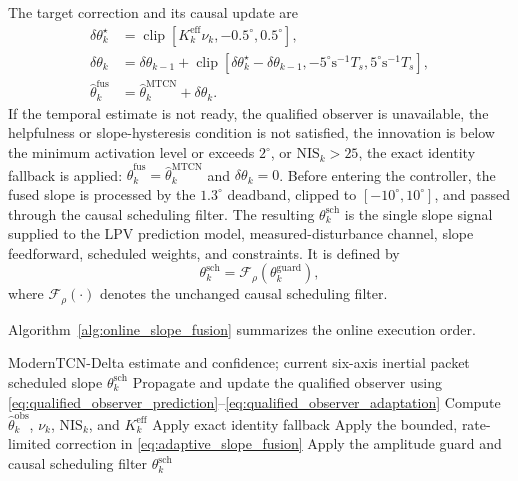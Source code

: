 \documentclass{ieeeaccess}
\begin{document}
The target correction and its causal update are
\begin{align}
\delta\theta_k^{\star}
&=\operatorname{clip}\!\left[
K_k^{\mathrm{eff}}\nu_k,-0.5^{\circ},0.5^{\circ}\right],\nonumber\\
\delta\theta_k
&=\delta\theta_{k-1}
+\operatorname{clip}\!\left[
\delta\theta_k^{\star}-\delta\theta_{k-1},
-5^{\circ}\mathrm{s}^{-1}T_s,5^{\circ}\mathrm{s}^{-1}T_s\right],\nonumber\\
\hat\theta_k^{\mathrm{fus}}
&=\hat\theta_k^{\mathrm{MTCN}}+\delta\theta_k .
\label{eq:adaptive_slope_fusion}
\end{align}
If the temporal estimate is not ready, the qualified observer is unavailable,
the helpfulness or slope-hysteresis condition is not satisfied, the innovation
is below the minimum activation level or exceeds $2^{\circ}$, or
$\mathrm{NIS}_k>25$, the exact identity fallback is applied:
$\hat\theta_k^{\mathrm{fus}}=\hat\theta_k^{\mathrm{MTCN}}$ and
$\delta\theta_k=0$. Before entering the controller, the fused slope is
processed by the $1.3^{\circ}$ deadband, clipped to
$[-10^{\circ},10^{\circ}]$, and passed through the causal scheduling filter.
The resulting $\theta_k^{\mathrm{sch}}$ is the single slope signal supplied to
the LPV prediction model, measured-disturbance channel, slope feedforward,
scheduled weights, and constraints. It is defined by
\begin{equation}
\theta_k^{\mathrm{sch}}=\mathcal F_{\rho}\!\left(\theta_k^{\mathrm{guard}}\right),
\label{eq:fused_slope_conditioning}
\end{equation}
where $\mathcal F_{\rho}(\cdot)$ denotes the unchanged causal scheduling
filter.

Algorithm~\ref{alg:online_slope_fusion} summarizes the online execution order.
\begin{algorithm}[!t]
\caption{Online slope fusion assisted by the qualified observer}
\label{alg:online_slope_fusion}
\begin{algorithmic}[1]
\Require ModernTCN-Delta estimate and confidence; current six-axis inertial packet
\Ensure scheduled slope $\theta_k^{\mathrm{sch}}$
\State Propagate and update the qualified observer using
\eqref{eq:qualified_observer_prediction}--\eqref{eq:qualified_observer_adaptation}
\State Compute $\hat\theta_k^{\mathrm{obs}}$, $\nu_k$, $\mathrm{NIS}_k$, and
$K_k^{\mathrm{eff}}$
    \State Apply exact identity fallback
\Else
    \State Apply the bounded, rate-limited correction in
    \eqref{eq:adaptive_slope_fusion}
\EndIf
\State Apply the amplitude guard and causal scheduling filter
\State \Return $\theta_k^{\mathrm{sch}}$
\end{algorithmic}
\end{algorithm}
\end{document}
